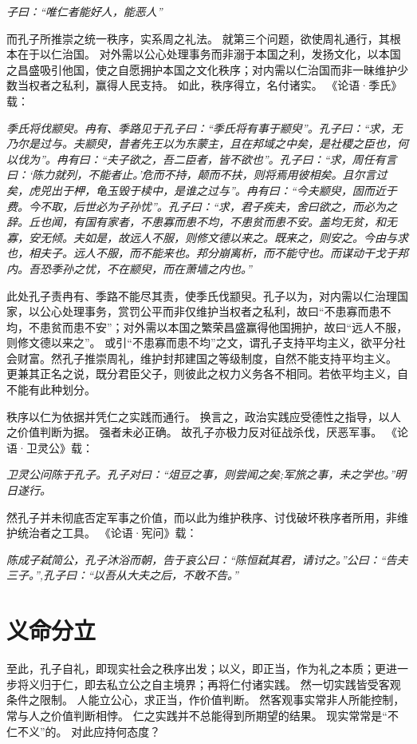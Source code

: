 \documentclass[11pt]{article}
\begin{document}
\textit{子曰：“唯仁者能好人，能恶人”}

而孔子所推崇之统一秩序，实系周之礼法。
就第三个问题，欲使周礼通行，其根本在于以仁治国。
对外需以公心处理事务而非溺于本国之利，发扬文化，以本国之昌盛吸引他国，使之自愿拥护本国之文化秩序；对内需以仁治国而非一昧维护少数当权者之私利，赢得人民支持。
如此，秩序得立，名付诸实。
《论语·季氏》载：

\textit{季氏将伐颛臾。冉有、季路见于孔子曰：“季氏将有事于颛臾”。孔子曰：“求，无乃尔是过与。夫颛臾，昔者先王以为东蒙主，且在邦域之中矣，是社稷之臣也，何以伐为”。冉有曰：“夫子欲之，吾二臣者，皆不欲也”。孔子曰：“求，周任有言曰：‘陈力就列，不能者止。’危而不持，颠而不扶，则将焉用彼相矣。且尔言过矣，虎兕出于柙，龟玉毁于椟中，是谁之过与”。冉有曰：“今夫颛臾，固而近于费。今不取，后世必为子孙忧”。孔子曰：“求，君子疾夫，舍曰欲之，而必为之辞。丘也闻，有国有家者，不患寡而患不均，不患贫而患不安。盖均无贫，和无寡，安无倾。夫如是，故远人不服，则修文德以来之。既来之，则安之。今由与求也，相夫子。远人不服，而不能来也。邦分崩离析，而不能守也。而谋动干戈于邦内。吾恐季孙之忧，不在颛臾，而在萧墙之内也。”}

此处孔子责冉有、季路不能尽其责，使季氏伐颛臾。孔子以为，对内需以仁治理国家，以公心处理事务，赏罚公平而非仅维护当权者之私利，故曰“不患寡而患不均，不患贫而患不安”；对外需以本国之繁荣昌盛赢得他国拥护，故曰“远人不服，则修文德以来之”。
或引“不患寡而患不均”之文，谓孔子支持平均主义，欲平分社会财富。然孔子推崇周礼，维护封邦建国之等级制度，自然不能支持平均主义。
更兼其正名之说，既分君臣父子，则彼此之权力义务各不相同。若依平均主义，自不能有此种划分。

\newline

秩序以仁为依据并凭仁之实践而通行。
换言之，政治实践应受德性之指导，以人之价值判断为据。
强者未必正确。
故孔子亦极力反对征战杀伐，厌恶军事。
《论语·卫灵公》载：

\textit{卫灵公问陈于孔子。孔子对曰：“俎豆之事，则尝闻之矣;军旅之事，未之学也。”明日遂行。}

然孔子并未彻底否定军事之价值，而以此为维护秩序、讨伐破坏秩序者所用，非维护统治者之工具。
《论语·宪问》载：

\textit{陈成子弑简公，孔子沐浴而朝，告于哀公曰：“陈恒弑其君，请讨之。”公曰：“告夫三子。”,孔子曰：“以吾从大夫之后，不敢不告。”}

\section{义命分立}
至此，孔子自礼，即现实社会之秩序出发；以义，即正当，作为礼之本质；更进一步将义归于仁，即去私立公之自主境界；再将仁付诸实践。
然一切实践皆受客观条件之限制。
人能立公心，求正当，作价值判断。
然客观事实常非人所能控制，常与人之价值判断相悖。
仁之实践并不总能得到所期望的结果。
现实常常是“不仁不义”的。
对此应持何态度？
\end{document}
